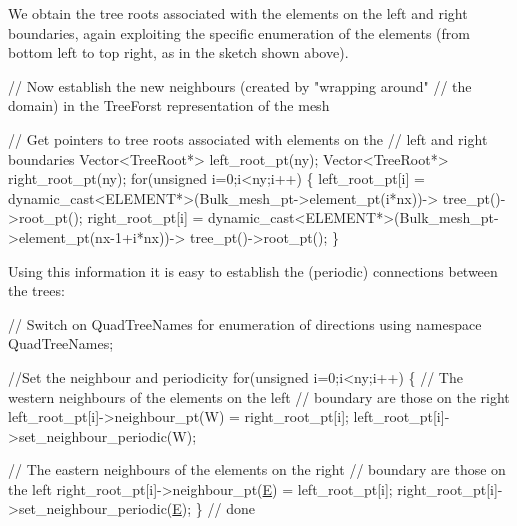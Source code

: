 We obtain the tree roots associated with the elements on the left and right boundaries, again exploiting the specific enumeration of the elements (from bottom left to top right, as in the sketch shown above).


\begin{DoxyCodeInclude}
 

 \textcolor{comment}{// Now establish the new neighbours (created by "wrapping around"}
 \textcolor{comment}{// the domain) in the TreeForst representation of the mesh}

 \textcolor{comment}{// Get pointers to tree roots associated with elements on the }
 \textcolor{comment}{// left and right boundaries}
  Vector<TreeRoot*> left\_root\_pt(ny);
  Vector<TreeRoot*> right\_root\_pt(ny);
  \textcolor{keywordflow}{for}(\textcolor{keywordtype}{unsigned} i=0;i<ny;i++) 
   \{
    left\_root\_pt[i] = 
     \textcolor{keyword}{dynamic\_cast<}ELEMENT*\textcolor{keyword}{>}(Bulk\_mesh\_pt->element\_pt(i*nx))->
     tree\_pt()->root\_pt();
    right\_root\_pt[i] = 
     \textcolor{keyword}{dynamic\_cast<}ELEMENT*\textcolor{keyword}{>}(Bulk\_mesh\_pt->element\_pt(nx-1+i*nx))->
     tree\_pt()->root\_pt();
   \}

\end{DoxyCodeInclude}


Using this information it is easy to establish the (periodic) connections between the trees\+:


\begin{DoxyCodeInclude}

  \textcolor{comment}{// Switch on QuadTreeNames for enumeration of directions}
   \textcolor{keyword}{using namespace }QuadTreeNames;

  \textcolor{comment}{//Set the neighbour and periodicity}
  \textcolor{keywordflow}{for}(\textcolor{keywordtype}{unsigned} i=0;i<ny;i++) 
   \{
    \textcolor{comment}{// The western neighbours of the elements on the left}
    \textcolor{comment}{// boundary are those on the right}
    left\_root\_pt[i]->neighbour\_pt(W) = right\_root\_pt[i];
    left\_root\_pt[i]->set\_neighbour\_periodic(W); 
    
    \textcolor{comment}{// The eastern neighbours of the elements on the right}
    \textcolor{comment}{// boundary are those on the left}
    right\_root\_pt[i]->neighbour\_pt(\hyperlink{namespaceGlobal__Parameters_a397f48e074d2589259ed5c6e4d89f948}{E}) = left\_root\_pt[i];
    right\_root\_pt[i]->set\_neighbour\_periodic(\hyperlink{namespaceGlobal__Parameters_a397f48e074d2589259ed5c6e4d89f948}{E});     
   \} \textcolor{comment}{// done}

\end{DoxyCodeInclude}


